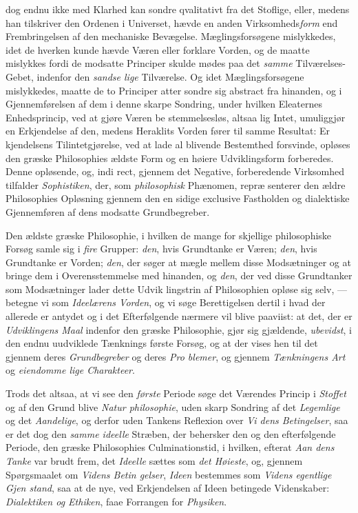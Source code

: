 dog endnu ikke med Klarhed kan sondre qvalitativt fra det
Stoflige, eller, medens han tilskriver den Ordenen i Universet,
hævde en anden Virksomheds\emph{form} end Frembringelsen af den
mechaniske Bevægelse. Mæglingsforsøgene mislykkedes, idet
de hverken kunde hævde Væren eller forklare Vorden, og de
maatte mislykkes fordi de modsatte Principer skulde mødes
paa det \emph{samme} Tilværelses-Gebet, indenfor den \emph{sandse\-%
lige} Tilværelse. Og idet Mæglingsforsøgene mislykkedes,
 maatte de to Principer atter sondre sig abstract fra hinanden,
og i Gjennemførelsen af dem i denne skarpe Sondring, under
hvilken Eleaternes Enhedsprincip, ved at gjøre Væren be\-%
stemmelsesløs, altsaa lig Intet, umuliggjør en Erkjendelse af
den, medens Heraklits Vorden fører til samme Resultat: Er\-%
kjendelsens Tilintetgjørelse, ved at lade al blivende Bestemthed
forsvinde, opløses den græske Philosophies ældste Form og en
høiere Udviklingsform forberedes. Denne opløsende, og, indi\-%
rect, gjennem det Negative, forberedende Virksomhed tilfalder
\emph{Sophistiken}, der, som \emph{philosophisk} Phænomen, repræ\-%
senterer den ældre Philosophies Opløsning gjennem den en\-%
sidige exclusive Fastholden og dialektiske Gjennemføren af
dens modsatte Grundbegreber.

Den ældste græske Philosophie, i hvilken de mange for\-%
skjellige philosophiske Forsøg samle sig i \emph{fire} Grupper: \emph{den},
hvis Grundtanke er Væren; \emph{den}, hvis Grundtanke er Vorden;
\emph{den}, der søger at mægle mellem disse Modsætninger og at
bringe dem i Overensstemmelse med hinanden, og \emph{den}, der
ved disse Grundtanker som Modsætninger lader dette Udvik\-%
lingstrin af Philosophien opløse sig selv, --- betegne vi som
\emph{Ideelærens Vorden}, og vi søge Berettigelsen dertil i hvad
der allerede er antydet og i det Efterfølgende nærmere vil
blive paaviist: at det, der er \emph{Udviklingens Maal} indenfor
den græske Philosophie, gjør sig gjældende, \emph{ubevidst}, i den
endnu uudviklede Tænknings første Forsøg, og at der vises
hen til det gjennem deres \emph{Grundbegreber} og deres \emph{Pro\-%
blemer}, og gjennem \emph{Tænkningens Art} og \emph{eiendomme\-%
lige Charakteer}.

Trods det altsaa, at vi see den \emph{første} Periode søge det
Værendes Princip i \emph{Stoffet} og af den Grund blive \emph{Natur\-%
philosophie}, uden skarp Sondring af det \emph{Legemlige} og
det \emph{Aandelige}, og derfor uden Tankens Reflexion over \emph{Vi\-%
dens Betingelser}, saa er det dog den \emph{samme ideelle}
Stræben, der behersker den og den efterfølgende Periode, den
græske Philosophies Culminationstid, i hvilken, efterat \emph{Aan\-%
\setcounter{footnote}{0}%
dens Tanke} var brudt frem, det \emph{Ideelle} sættes som \emph{det
Høieste}, og, gjennem Spørgsmaalet om \emph{Videns Betin\-%
gelser}, \emph{Ideen} bestemmes som \emph{Videns egentlige Gjen\-%
stand}, saa at de nye, ved Erkjendelsen af Ideen betingede
Videnskaber: \emph{Dialektiken og Ethiken}, faae Forrangen for
\emph{Physiken}.

